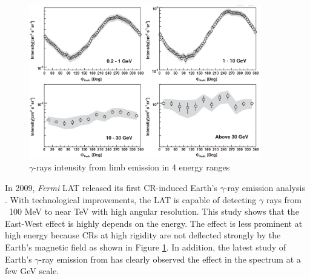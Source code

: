 \begin{figure}[h!]
    \centering
    \includegraphics[width=0.9\textwidth]{content/literature_review/figures/fermi_eastwest.png}
    \caption{
        $\gamma$-rays intensity from limb emission in 4 energy ranges
        \citep{fermilat_gamma_induced}
    }
    \label{fig:fermi_eastwest}
\end{figure}

In 2009,
{\it Fermi} LAT released its first CR-induced Earth's
$\gamma$-ray emission analysis \cite{fermilat_gamma_induced}.
With technological improvements, the LAT is capable of detecting
$\gamma$ rays from ~100 MeV to near TeV with high angular resolution.
This study shows that the East-West effect is highly depends on the energy.
The effect is less prominent at high energy because CRs at
high rigidity are not deflected strongly by the Earth's
magnetic field as shown in Figure \ref{fig:fermi_eastwest}.
In addition, the latest study of Earth's $\gamma$-ray emission
from \cite{madlee2020} has clearly observed the 
effect in the spectrum at a few GeV scale.




